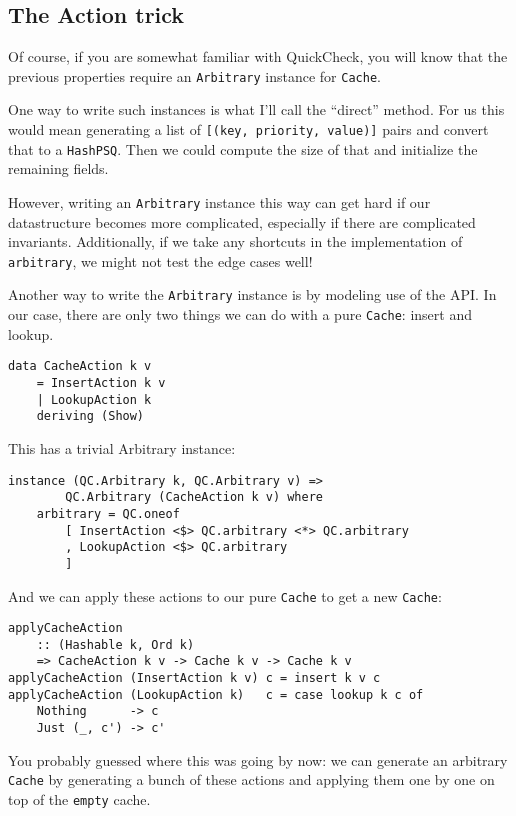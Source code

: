 \subsection{The Action trick}


Of course, if you are somewhat familiar with QuickCheck, you will know that the previous properties require an \texttt{Arbitrary} instance for \texttt{Cache}.

One way to write such instances is what I'll call the ``direct'' method. For us this would mean generating a list of \texttt{[(key, priority, value)]} pairs and convert that to a \texttt{HashPSQ}. Then we could compute the size of that and initialize the remaining fields.

However, writing an \texttt{Arbitrary} instance this way can get hard if our datastructure becomes more complicated, especially if there are complicated invariants. Additionally, if we take any shortcuts in the implementation of \texttt{arbitrary}, we might not test the edge cases well!

Another way to write the \texttt{Arbitrary} instance is by modeling use of the API. In our case, there are only two things we can do with a pure \texttt{Cache}: insert and lookup.

\begin{verbatim}
data CacheAction k v
    = InsertAction k v
    | LookupAction k
    deriving (Show)
\end{verbatim}
This has a trivial Arbitrary instance:

\begin{verbatim}
instance (QC.Arbitrary k, QC.Arbitrary v) =>
        QC.Arbitrary (CacheAction k v) where
    arbitrary = QC.oneof
        [ InsertAction <$> QC.arbitrary <*> QC.arbitrary
        , LookupAction <$> QC.arbitrary
        ]
\end{verbatim}
And we can apply these actions to our pure \texttt{Cache} to get a new \texttt{Cache}:

\begin{verbatim}
applyCacheAction
    :: (Hashable k, Ord k)
    => CacheAction k v -> Cache k v -> Cache k v
applyCacheAction (InsertAction k v) c = insert k v c
applyCacheAction (LookupAction k)   c = case lookup k c of
    Nothing      -> c
    Just (_, c') -> c'
\end{verbatim}
You probably guessed where this was going by now: we can generate an arbitrary \texttt{Cache} by generating a bunch of these actions and applying them one by one on top of the \texttt{empty} cache.

